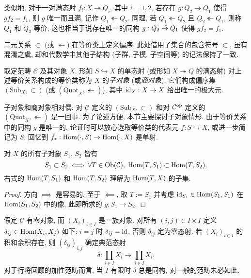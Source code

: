 类似地, 对于一对满态射 $f_i: X \twoheadrightarrow Q_i$, 其中 $i = 1, 2$, 若存在 $g: Q_2 \to Q_1$ 使得 $g f_2 = f_1$, 则 $g$ 唯一而且满, 记作 $Q_1 \twoheadleftarrow Q_2$. 同理, 若 $Q_1 \twoheadleftarrow Q_2$ 且 $Q_2 \twoheadleftarrow Q_1$, 则称 $Q_1$ 和 $Q_2$ 等价; 这也相当于说存在唯一的同构 $g: Q_2 \stackrel{\sim}{\rightarrow} Q_1$ 使得 $g f_2 = f_1$.

二元关系 $\subset$ (或 $\twoheadleftarrow$) 在等价类上定义偏序. 此处借用了集合的包含符号 $\subset$, 虽有混淆之虞, 却和代数学中其他子结构 (子群, 子模, 子空间等) 的记法保持了一致.

\begin{definition}\label{def:sub-quot-obj}
	 
	 
	取定范畴 $\mathcal{C}$ 及其对象 $X$. 形如 $S \hookrightarrow X$ 的单态射 (或形如 $X \twoheadrightarrow Q$ 的满态射) 对上述等价关系构成的等价类称为 $X$ 的\emph{子对象} (或\emph{商对象}), 它们构成偏序集 $(\mathrm{Sub}_X, \subset)$ (或 $(\mathrm{Quot}_X, \twoheadleftarrow)$), 其中 $\mathrm{id}_X: X \to X$ 给出唯一的极大元.
\end{definition}

子对象和商对象相对偶: 对 $\mathcal{C}$ 定义的 $(\mathrm{Sub}_X, \subset)$ 和对 $\mathcal{C}^{\operatorname{op}}$ 定义的 $(\mathrm{Quot}_X, \twoheadleftarrow)$ 是一回事. 为了论述方便, 本节主要探讨子对象情形. 由于等价关系中的同构 $g$ 是唯一的, 论证时可以放心选取等价类的代表元 $f: S \hookrightarrow X$, 或进一步简记为 $S$; 回忆到 $f_*: \operatorname{Hom}(\cdot, S) \to \operatorname{Hom}(\cdot, X)$ 是单射.

\begin{lemma}\label{prop:subobject-order}
	对 $X$ 的所有子对象 $S_1$, $S_2$ 皆有
	\begin{equation*}
		S_1 \subset S_2 \iff \forall T \in \operatorname{Ob}(\mathcal{C}), \; \operatorname{Hom}(T, S_1) \subset \operatorname{Hom}(T, S_2),
	\end{equation*}
	右式的 $\operatorname{Hom}(T, S_1)$ 和 $\operatorname{Hom}(T, S_2)$ 理解为 $\operatorname{Hom}(T, X)$ 的子集.
\end{lemma}
\begin{proof}
	方向 $\implies$ 是容易的, 至于 $\impliedby$, 取 $T := S_1$ 并考虑 $\mathrm{id}_{S_1} \in \operatorname{Hom}(S_1, S_1)$ 在 $\operatorname{Hom}(S_1, S_2)$ 中的像, 此即所求的 $g: S_1 \to S_2$.
\end{proof}

假定 $\mathcal{C}$ 有零对象, 而 $(X_i)_{i \in I}$ 是一族对象. 对所有 $(i,j) \in I \times I$ 定义 $\delta_{ij} \in \operatorname{Hom}(X_i, X_j)$ 如下: $i=j$ 时 $\delta_{ij} = \mathrm{id}$, 否则 $\delta_{ij}$ 定为零态射. 若 $(X_i)_{i \in I}$ 的积和余积存在, 则 $(\delta_{ij})_{i,j}$ 确定典范态射
\begin{equation}\label{eqn:coprod-prod-delta}
	\delta: \coprod_{i \in I} X_i \to \prod_{i \in I} X_i.
\end{equation}
对于行将回顾的加性范畴而言, 当 $I$ 有限时 $\delta$ 总是同构, 对一般的范畴未必如此.


